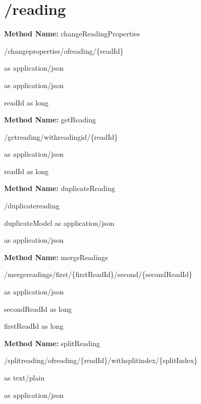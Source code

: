 \section{/reading}
\textbf{Method Name: }changeReadingProperties
\begin{post}
/changeproperties/ofreading/\{readId\}
\end{post}
\begin{request}
 as application/json
\end{request}
\begin{response}
 as application/json
\end{response}
\begin{parameter}
readId as long
\end{parameter}
\textbf{Method Name: }getReading
\begin{get}
/getreading/withreadingid/\{readId\}
\end{get}
\begin{response}
 as application/json
\end{response}
\begin{parameter}
readId as long
\end{parameter}
\textbf{Method Name: }duplicateReading
\begin{post}
/duplicatereading
\end{post}
\begin{request}
duplicateModel as application/json
\end{request}
\begin{response}
 as application/json
\end{response}
\textbf{Method Name: }mergeReadings
\begin{post}
/mergereadings/first/\{firstReadId\}/second/\{secondReadId\}
\end{post}
\begin{response}
 as application/json
\end{response}
\begin{parameter}
secondReadId as long
\end{parameter}
\begin{parameter}
firstReadId as long
\end{parameter}
\textbf{Method Name: }splitReading
\begin{post}
/splitreading/ofreading/\{readId\}/withsplitindex/\{splitIndex\}
\end{post}
\begin{request}
 as text/plain
\end{request}
\begin{response}
 as application/json
\end{response}
